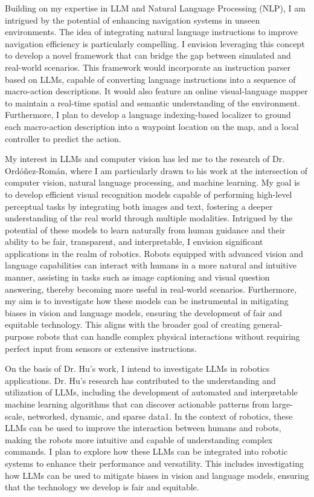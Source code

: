 \documentclass[a4,20pt]{article}
\begin{document}
\begin{large}
Building on my expertise in LLM and Natural Language Processing (NLP), I am intrigued by the potential of enhancing navigation systems in unseen environments. The idea of integrating natural language instructions to improve navigation efficiency is particularly compelling. I envision leveraging this concept to develop a novel framework that can bridge the gap between simulated and real-world scenarios. This framework would incorporate an instruction parser based on LLMs, capable of converting language instructions into a sequence of macro-action descriptions. It would also feature an online visual-language mapper to maintain a real-time spatial and semantic understanding of the environment. Furthermore, I plan to develop a language indexing-based localizer to ground each macro-action description into a waypoint location on the map, and a local controller to predict the action.

My interest in LLMs and computer vision has led me to the research of Dr. Ordóñez-Román, where I am particularly drawn to his work at the intersection of computer vision, natural language processing, and machine learning. My goal is to develop efficient visual recognition models capable of performing high-level perceptual tasks by integrating both images and text, fostering a deeper understanding of the real world through multiple modalities. Intrigued by the potential of these models to learn naturally from human guidance and their ability to be fair, transparent, and interpretable, I envision significant applications in the realm of robotics. Robots equipped with advanced vision and language capabilities can interact with humans in a more natural and intuitive manner, assisting in tasks such as image captioning and visual question answering, thereby becoming more useful in real-world scenarios. Furthermore, my aim is to investigate how these models can be instrumental in mitigating biases in vision and language models, ensuring the development of fair and equitable technology. This aligns with the broader goal of creating general-purpose robots that can handle complex physical interactions without requiring perfect input from sensors or extensive instructions. 

On the basis of Dr. Hu's work, I intend to investigate LLMs in robotics applications. Dr. Hu’s research has contributed to the understanding and utilization of LLMs, including the development of automated and interpretable machine learning algorithms that can discover actionable patterns from large-scale, networked, dynamic, and sparse data1. In the context of robotics, these LLMs can be used to improve the interaction between humans and robots, making the robots more intuitive and capable of understanding complex commands. I plan to explore how these LLMs can be integrated into robotic systems to enhance their performance and versatility. This includes investigating how LLMs can be used to mitigate biases in vision and language models, ensuring that the technology we develop is fair and equitable. 




\end{large}
\end{document}
